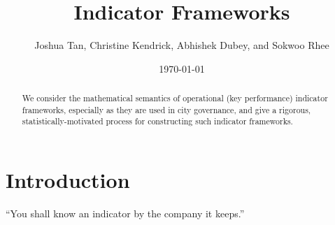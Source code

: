 \documentclass{article}
\title{Indicator Frameworks}
\author{Joshua Tan, Christine Kendrick, Abhishek Dubey, and Sokwoo Rhee}
\date{\today}
\theoremstyle{definition}
\begin{document}
\maketitle

\begin{abstract}
We consider the mathematical semantics of operational (key performance) indicator frameworks, especially as they are used in city governance, and give a rigorous, statistically-motivated process for constructing such indicator frameworks. %
\end{abstract}





\section{Introduction}
``You shall know an indicator by the company it keeps.''
\end{document}
